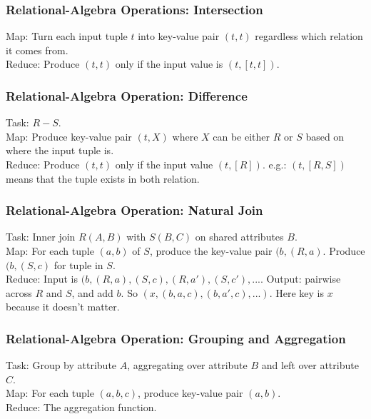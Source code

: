 \subsubsection{Relational-Algebra Operations: Intersection} 
Map: Turn each input tuple $t$ into key-value pair $(t,t)$ regardless which relation it comes from. \\

Reduce: Produce $(t, t)$ only if the input value is $(t, [t, t])$. 

\subsubsection{Relational-Algebra Operation: Difference} 
Task: $R - S$. \\

Map: Produce key-value pair $(t, X)$ where $X$ can be either $R$ or $S$ based on where the input tuple is. \\

Reduce: Produce $(t, t)$ only if the input value $(t, [R])$. e.g.: $(t, [R,S])$ means that the tuple exists in both relation. 

\subsubsection{Relational-Algebra Operation: Natural Join} 
Task: Inner join $R(A,B)$ with $S(B,C)$ on shared attributes $B$. \\

Map: For each tuple $(a,b)$ of $S$, produce the key-value pair $(b, (R,a)$. Produce $(b, (S,c)$ for tuple in $S$. \\

Reduce: Input is $(b, (R,a), (S,c), (R,a'), (S,c'),...$. Output: pairwise across $R$ and $S$, and add $b$. So $(x, (b,a,c), (b,a',c),...)$. Here key is $x$ because it doesn't matter. 

\subsubsection{Relational-Algebra Operation: Grouping and Aggregation} 
Task: Group by attribute $A$, aggregating over attribute $B$ and left over attribute $C$. \\

Map: For each tuple $(a,b,c)$, produce key-value pair $(a,b)$. \\

Reduce: The aggregation function. 


